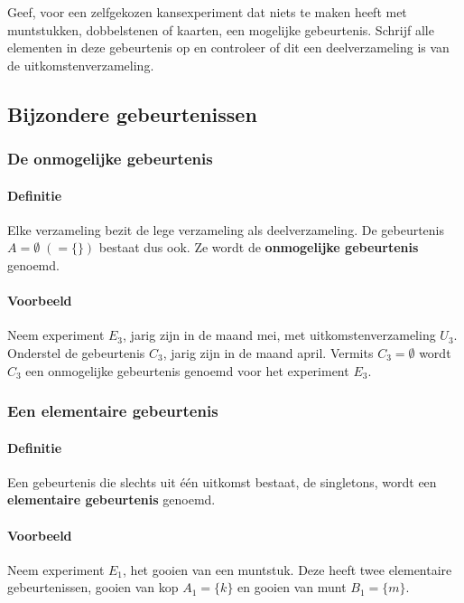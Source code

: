 \documentclass[12pt,a4paper,twoside]{article}
\begin{document}
\begin{oefening}
Geef, voor een zelfgekozen kansexperiment dat niets te maken heeft met muntstukken, dobbelstenen of kaarten, een mogelijke gebeurtenis. Schrijf alle elementen in deze gebeurtenis op en controleer of dit een deelverzameling is van de uitkomstenverzameling.
\end{oefening}

\subsection{Bijzondere gebeurtenissen}

\subsubsection{De onmogelijke gebeurtenis}

\paragraph*{Definitie} Elke verzameling bezit de lege verzameling als deelverzameling. De gebeurtenis $A = \emptyset \;(=\{\})$ bestaat dus ook. Ze wordt de {\bf onmogelijke gebeurtenis} genoemd.

\paragraph*{Voorbeeld}
Neem experiment $E_3$, jarig zijn in de maand mei, met uitkomstenverzameling $U_3$. Onderstel de gebeurtenis $C_3$, jarig zijn in de maand april. Vermits $C_3=\emptyset$ wordt $C_3$ een onmogelijke gebeurtenis genoemd voor het experiment $E_3$.

\subsubsection{Een elementaire gebeurtenis}

\paragraph*{Definitie} Een gebeurtenis die slechts uit één uitkomst bestaat, de singletons, wordt een {\bf elementaire gebeurtenis} genoemd.

\paragraph*{Voorbeeld}
Neem experiment $E_1$, het gooien van een muntstuk. Deze heeft twee elementaire gebeurtenissen, gooien van kop $A_1=\{k\}$ en gooien van munt $B_1=\{m\}$.
\end{document}
